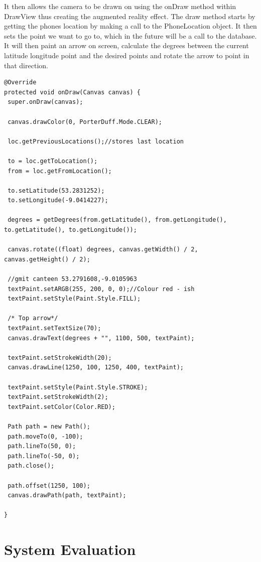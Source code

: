 It then allows the camera to be drawn on using the onDraw method within DrawView thus creating the augmented reality effect. The draw method starts by getting the phones location by making a call to the PhoneLocation object. It then sets the point we want to go to, which in the future will be a call to the database. It will then paint an arrow on screen, calculate the degrees between the current latitude longitude point and the desired points and rotate the arrow to point in that direction.
\begin{verbatim}
@Override
protected void onDraw(Canvas canvas) {
 super.onDraw(canvas);

 canvas.drawColor(0, PorterDuff.Mode.CLEAR);

 loc.getPreviousLocations();//stores last location

 to = loc.getToLocation();
 from = loc.getFromLocation();

 to.setLatitude(53.2831252);
 to.setLongitude(-9.0414227);

 degrees = getDegrees(from.getLatitude(), from.getLongitude(), to.getLatitude(), to.getLongitude());

 canvas.rotate((float) degrees, canvas.getWidth() / 2, canvas.getHeight() / 2);

 //gmit canteen 53.2791608,-9.0105963
 textPaint.setARGB(255, 200, 0, 0);//Colour red - ish
 textPaint.setStyle(Paint.Style.FILL);

 /* Top arrow*/
 textPaint.setTextSize(70);
 canvas.drawText(degrees + "", 1100, 500, textPaint);

 textPaint.setStrokeWidth(20);
 canvas.drawLine(1250, 100, 1250, 400, textPaint);

 textPaint.setStyle(Paint.Style.STROKE);
 textPaint.setStrokeWidth(2);
 textPaint.setColor(Color.RED);

 Path path = new Path();
 path.moveTo(0, -100);
 path.lineTo(50, 0);
 path.lineTo(-50, 0);
 path.close();

 path.offset(1250, 100);
 canvas.drawPath(path, textPaint);
 
}
\end{verbatim}

\chapter{System Evaluation}

